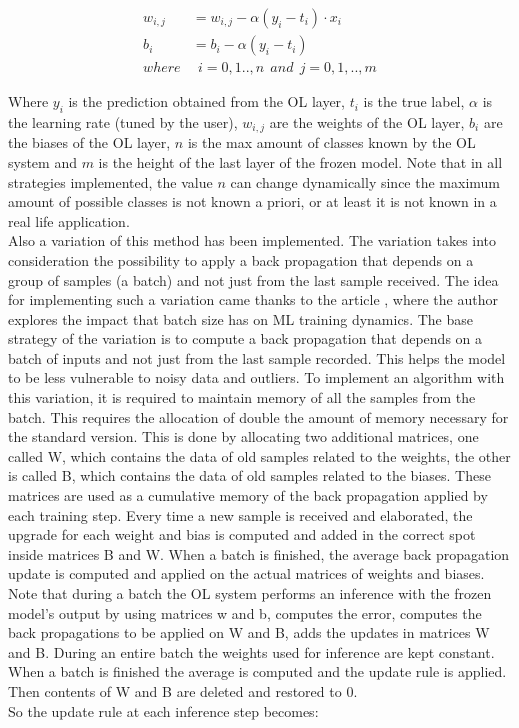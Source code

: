 \documentclass[12pt]{report}
\begin{document}
\begin{align}
    w_{i,j} &= w_{i,j} - \alpha (y_i - t_i) \cdot x_i \\
    b_i     &= b_i - \alpha (y_i - t_i) \\
    where & \: \: i= 0,1..,n  \: \: and \: \:  j=0,1,..,m \nonumber 
\end{align}

Where $y_i$ is the prediction obtained from the OL layer, $t_i$ is the true label, $\alpha$ is the learning rate (tuned by the user), $w_{i,j}$ are the weights of the OL layer, $b_i$ are the biases of the OL layer, $n$ is the max amount of classes known by the OL system and $m$ is the height of the last layer of the frozen model. Note that in all strategies implemented, the value $n$ can change dynamically since the maximum amount of possible classes is not known a priori, or at least it is not known in a real life application. \\
Also a variation of this method has been implemented. The variation takes into consideration the possibility to apply a back propagation that depends on a group of samples (a batch) and not just from the last sample received. The idea for implementing such a variation came thanks to the article \autocite{batch_size_medium}, where the author explores the impact that batch size has on ML training dynamics. The base strategy of the variation is to compute a back propagation that depends on a batch of inputs and not just from the last sample recorded. This helps the model to be less vulnerable to noisy data and outliers. To implement an algorithm with this variation, it is required to maintain memory of all the samples from the batch. This requires the allocation of double the amount of memory necessary for the standard version. This is done by allocating two additional matrices, one called W, which contains the data of old samples related to the weights, the other is called B, which contains the data of old samples related to the biases. These matrices are used as a cumulative memory of the back propagation applied by each training step. Every time a new sample is received and elaborated, the upgrade for each weight and bias is computed and added in the correct spot inside matrices B and W. When a batch is finished, the average back propagation update is computed and applied on the actual matrices of weights and biases. Note that during a batch the OL system performs an inference with the frozen model's output by using matrices w and b, computes the error, computes the back propagations to be applied on W and B, adds the updates in matrices W and B. During an entire batch the weights used for inference are kept constant. When a batch is finished the average is computed and the update rule is applied. Then contents of W and B are deleted and restored to 0. \\
So the update rule at each inference step becomes:
\end{document}
